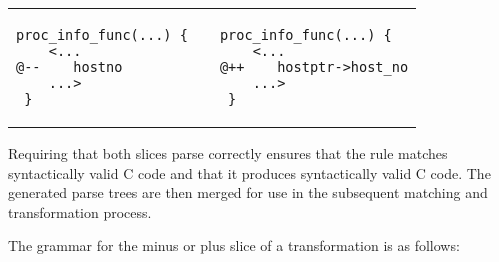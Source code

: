 {%
\begin{center}
\begin{tabular}{p{5cm}p{3cm}p{5cm}}
\begin{lstlisting}[language=Cocci]
  proc_info_func(...) {
    <...
@--    hostno
    ...>
 }
\end{lstlisting}
&&
\begin{lstlisting}[language=Cocci]
  proc_info_func(...) {
    <...
@++    hostptr->host_no
    ...>
 }
\end{lstlisting}
\end{tabular}
\end{center}
}

\noindent
Requiring that both slices parse correctly ensures that the rule matches
syntactically valid C code and that it produces syntactically valid C code.
The generated parse trees are then merged for use in the subsequent
matching and transformation process.

The grammar for the minus or plus slice of a transformation is as follows:

